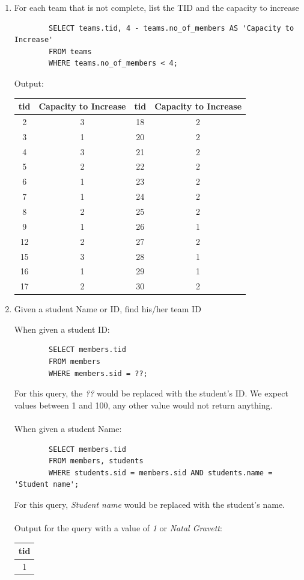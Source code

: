 \documentclass[11pt,letterpaper]{article}
\begin{document}
\begin{enumerate}
				\pagebreak
		
		\item For each team that is not complete, list the TID and the capacity to increase
		
		\begin{verbatim}
		SELECT teams.tid, 4 - teams.no_of_members AS 'Capacity to Increase' 
		FROM teams 
		WHERE teams.no_of_members < 4;
		\end{verbatim}
		Output:
		\begin{center}
			\begin{tabular}{ | c | c | c | c | }
				\hline
				tid & Capacity to Increase & tid & Capacity to Increase\\
				\hline
				2 & 3 & 18 & 2 \\
				3 & 1 & 20 & 2 \\
				4 & 3 & 21 & 2 \\
				5 & 2 & 22 & 2 \\
				6 & 1 & 23 & 2 \\
				7 & 1 & 24 & 2 \\
				8 & 2 & 25 & 2 \\
				9 & 1 & 26 & 1 \\
				12 & 2 & 27 & 2 \\
				15 & 3 & 28 & 1 \\
				16 & 1 & 29 & 1 \\
				17 & 2 & 30 & 2 \\
				\hline
			\end{tabular}
		\end{center}
		
		\item Given a student Name or ID, find his/her team ID
		
		When given a student ID:
		\begin{verbatim}
		SELECT members.tid 
		FROM members 
		WHERE members.sid = ??;
		\end{verbatim}
		For this query, the \textit{??} would be replaced with the student's ID. We expect values between 1 and 100, any other value would not return anything.\\
		\\
		When given a student Name:
		\begin{verbatim}
		SELECT members.tid 
		FROM members, students 
		WHERE students.sid = members.sid AND students.name = 'Student name';
		\end{verbatim}
		For this query, \textit{Student name} would be replaced with the student's name.\\
		\\
		Output for the query with a value of \textit{1} or \textit{Natal Gravett}:
		\begin{center}
			\begin{tabular}{ | c | }
				\hline
				tid \\
				\hline
				1\\
				\hline
			\end{tabular}
		\end{center}
		

\end{enumerate}
\end{document}
